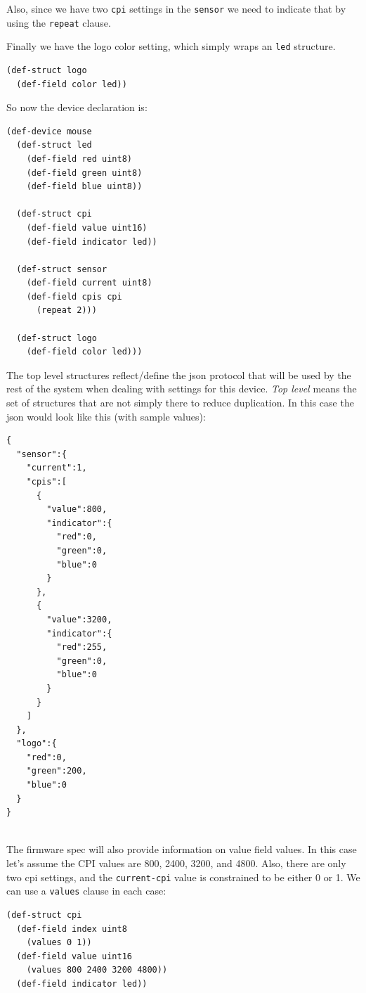 \documentclass[12pt]{article}
\begin{document}
Also, since we have two \verb|cpi| settings in the \verb|sensor| we
need to indicate that by using the \verb|repeat| clause.

Finally we have the logo color setting, which simply wraps an
\verb|led| structure.

\begin{verbatim}
(def-struct logo
  (def-field color led))
\end{verbatim}

So now the device declaration is:

\begin{verbatim}
(def-device mouse
  (def-struct led
    (def-field red uint8)
    (def-field green uint8)
    (def-field blue uint8))

  (def-struct cpi
    (def-field value uint16)
    (def-field indicator led))

  (def-struct sensor
    (def-field current uint8)
    (def-field cpis cpi
      (repeat 2)))

  (def-struct logo
    (def-field color led)))
\end{verbatim}

The top level structures reflect/define the json protocol that will be used by
the rest of the system when dealing with settings for this device.
{\em Top level} means the set of structures that are not simply there
to reduce duplication. In this case the json would look like this
(with sample values):

\begin{verbatim}
{
  "sensor":{
    "current":1,
    "cpis":[
      {
        "value":800,
        "indicator":{
          "red":0,
          "green":0,
          "blue":0
        }
      },
      {
        "value":3200,
        "indicator":{
          "red":255,
          "green":0,
          "blue":0
        }
      }
    ]
  },
  "logo":{
    "red":0,
    "green":200,
    "blue":0
  }
}
 
\end{verbatim}

The firmware spec will also provide information on value field values.
In this case let's assume the CPI values are 800, 2400, 3200, and
4800. Also, there are only two cpi settings, and the \verb|current-cpi| value is
constrained to be either 0 or 1.  We can use a \verb|values| clause
in each case:

\begin{verbatim}
(def-struct cpi
  (def-field index uint8
    (values 0 1))
  (def-field value uint16
    (values 800 2400 3200 4800))
  (def-field indicator led))
\end{verbatim}
\end{document}
